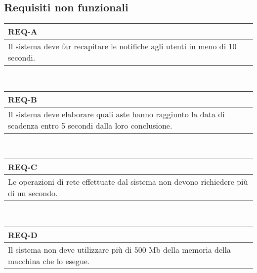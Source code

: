         \subsection{Requisiti non funzionali}
            \begin{tabular}{|p{}|}
                \hline
                \multicolumn{1}{|l|}{\cellcolor{head}\textbf{REQ-A}} \\
                \hline
                Il sistema deve far recapitare le notifiche agli utenti in meno di 10 secondi. \\
                \hline
            \end{tabular} \smallskip \\
            \begin{tabular}{|p{}|}
                \hline
                \multicolumn{1}{|l|}{\cellcolor{head}\textbf{REQ-B}} \\
                \hline
                Il sistema deve elaborare quali aste hanno raggiunto la data di scadenza entro 5 secondi dalla loro conclusione. \\
                \hline
            \end{tabular} \smallskip \\
            \begin{tabular}{|p{}|}
                \hline
                \multicolumn{1}{|l|}{\cellcolor{head}\textbf{REQ-C}} \\
                \hline
                Le operazioni di rete effettuate dal sistema non devono richiedere più di un secondo. \\
                \hline
            \end{tabular} \smallskip \\
            \begin{tabular}{|p{}|}
                \hline
                \multicolumn{1}{|l|}{\cellcolor{head}\textbf{REQ-D}} \\
                \hline
                Il sistema non deve utilizzare più di 500 Mb della memoria della macchina che lo esegue. \\
                \hline
            \end{tabular} \smallskip \\